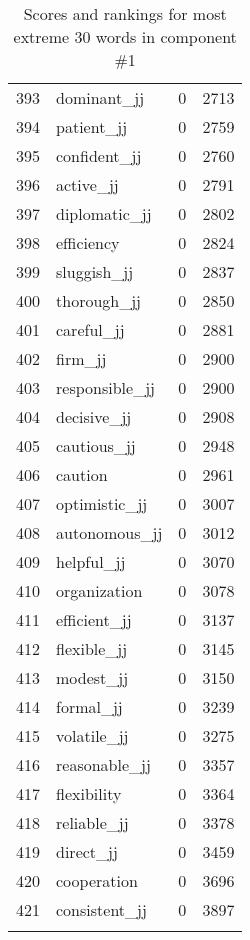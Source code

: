 \begin{longtable}[!htbp]{| rlr@{.}l |}
    393 & dominant\_jj & 0 & 2713 \\
    394 & patient\_jj & 0 & 2759 \\
    395 & confident\_jj & 0 & 2760 \\
    396 & active\_jj & 0 & 2791 \\
    397 & diplomatic\_jj & 0 & 2802 \\
    398 & efficiency & 0 & 2824 \\
    399 & sluggish\_jj & 0 & 2837 \\
    400 & thorough\_jj & 0 & 2850 \\
    401 & careful\_jj & 0 & 2881 \\
    402 & firm\_jj & 0 & 2900 \\
    403 & responsible\_jj & 0 & 2900 \\
    404 & decisive\_jj & 0 & 2908 \\
    405 & cautious\_jj & 0 & 2948 \\
    406 & caution & 0 & 2961 \\
    407 & optimistic\_jj & 0 & 3007 \\
    408 & autonomous\_jj & 0 & 3012 \\
    409 & helpful\_jj & 0 & 3070 \\
    410 & organization & 0 & 3078 \\
    411 & efficient\_jj & 0 & 3137 \\
    412 & flexible\_jj & 0 & 3145 \\
    413 & modest\_jj & 0 & 3150 \\
    414 & formal\_jj & 0 & 3239 \\
    415 & volatile\_jj & 0 & 3275 \\
    416 & reasonable\_jj & 0 & 3357 \\
    417 & flexibility & 0 & 3364 \\
    418 & reliable\_jj & 0 & 3378 \\
    419 & direct\_jj & 0 & 3459 \\
    420 & cooperation & 0 & 3696 \\
    421 & consistent\_jj & 0 & 3897 \\
    \hline
    \caption{Scores and rankings for most extreme 30 words in component \#1} \\
\end{longtable}
